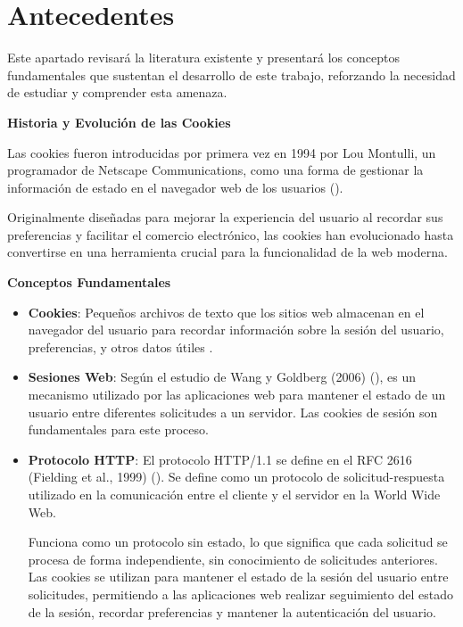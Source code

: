 \section{Antecedentes}

Este apartado revisará la literatura existente y presentará los conceptos fundamentales que sustentan el desarrollo de este trabajo, reforzando la necesidad de estudiar y comprender esta amenaza.

\bigskip

\textbf{Historia y Evolución de las Cookies}

Las cookies fueron introducidas por primera vez en 1994 por Lou Montulli, un programador de Netscape Communications, como una forma de gestionar la información de estado en el navegador web de los usuarios (\cite{kristol2001}). 

Originalmente diseñadas para mejorar la experiencia del usuario al recordar sus preferencias y facilitar el comercio electrónico, las cookies han evolucionado hasta convertirse en una herramienta crucial para la funcionalidad de la web moderna.

\bigskip

\textbf{Conceptos Fundamentales}
\begin{itemize}
    \item \textbf{Cookies}: Pequeños archivos de texto que los sitios web almacenan en el navegador del usuario para recordar información sobre la sesión del usuario, preferencias, y otros datos útiles \cite{rosenblum2001}.

    \item \textbf{Sesiones Web}: Según el estudio de Wang y Goldberg (2006) (\cite{wang2006}), es un mecanismo utilizado por las aplicaciones web para mantener el estado de un usuario entre diferentes solicitudes a un servidor. Las cookies de sesión son fundamentales para este proceso.

    \item \textbf{Protocolo HTTP}: El protocolo HTTP/1.1 se define en el RFC 2616 (Fielding et al., 1999) (\cite{fielding1999}). Se define como un protocolo de solicitud-respuesta utilizado en la comunicación entre el cliente y el servidor en la World Wide Web. 
    
    Funciona como un protocolo sin estado, lo que significa que cada solicitud se procesa de forma independiente, sin conocimiento de solicitudes anteriores. Las cookies se utilizan para mantener el estado de la sesión del usuario entre solicitudes, permitiendo a las aplicaciones web realizar seguimiento del estado de la sesión, recordar preferencias y mantener la autenticación del usuario. 
\end{itemize}

